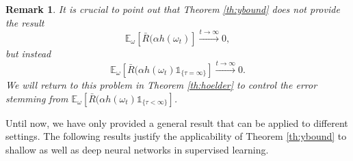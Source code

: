 \documentclass[10pt]{article} %
\newcommand{\bE}{\mathbb{E}}
\newtheorem{remark}{Remark}
\begin{document}
\begin{remark}\label{remark:ConvergenceinExpectation}
    It is crucial to point out that Theorem \ref{th:ybound} does not provide the result
    $$\bE_\omega[\bar{R}(\alpha h(\omega_t)]\xrightarrow[]{t\rightarrow \infty} 0,$$
    but instead 
    $$\bE_\omega[\bar{R}(\alpha h(\omega_t)\mathds{1}_{\{\tau=\infty\}}]\xrightarrow[]{t\rightarrow \infty}0.$$
    We will return to this problem in Theorem \ref{th:hoelder} to control the error stemming from $\bE_\omega[\bar{R}(\alpha h(\omega_t)\mathds{1}_{\{\tau<\infty\}}]$.
\end{remark}
Until now, we have only provided a general result that can be applied to different settings. The following results justify the applicability of Theorem \ref{th:ybound} to shallow as well as deep neural networks in supervised learning.
\end{document}
